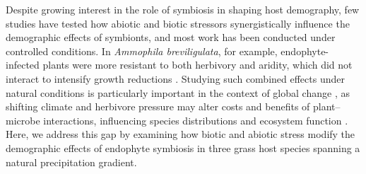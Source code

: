 \documentclass[12pt]{article}\usepackage[]{graphicx}\usepackage[dvipsnames]{xcolor}
\begin{document}
Despite growing interest in the role of symbiosis in shaping host demography, few studies have tested how abiotic and biotic stressors synergistically influence the demographic effects of symbionts, and most work has been conducted under controlled conditions.
In \emph{Ammophila breviligulata}, for example, endophyte-infected plants were more resistant to both herbivory and aridity, which did not interact to intensify growth reductions \citep{emery2010variation}.
Studying such combined effects under natural conditions is particularly important in the context of global change \citep{louthan2015and}, as shifting climate and herbivore pressure may alter costs and benefits of plant--microbe interactions, influencing species distributions and ecosystem function \citep{reynolds2003grassroots}.
Here, we address this gap by examining how biotic and abiotic stress modify the demographic effects of endophyte symbiosis in three grass host species spanning a natural precipitation gradient.
\end{document}
